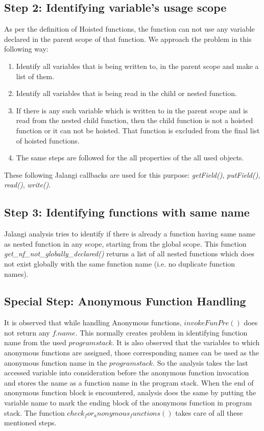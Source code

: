 \documentclass[accentcolor=tud0b,12pt,paper=a4]{tudreport}
\begin{document}
\subsection{Step 2: Identifying variable's usage scope}
As per the definition of Hoisted functions, the function can not use any variable declared in the parent scope of that function. We approach the problem in this following way:
\begin{enumerate}
	\item Identify all variables that is being written to, in the parent scope and make a list of them.
	\item Identify all variables that is being read in the child or nested function. 
	\item If there is any such variable which is written to in the parent scope and is read from the nested child function, then the child function is not a hoisted function or it can not be hoisted. That function is excluded from the final list of hoisted functions.
	\item The same steps are followed for the all properties of the all used objects.
\end{enumerate}
These following Jalangi callbacks are used for this purpose: \emph{getField()}, \emph{putField()}, \emph{read()}, \emph{write()}.

\subsection{Step 3: Identifying functions with same name}
Jalangi analysis tries to identify if there is already a function having same name as nested function in any scope, starting from the global scope. This function \emph{get\_nf\_not\_globally\_declared()} returns a list of all nested functions which does not exist globally with the same function name (i.e. no duplicate function names).

\subsection{Special Step: Anonymous Function Handling}
It is observed that while handling Anonymous functions, $invokeFunPre()$ does not return any $f.name$. This normally creates problem in identifying function name from the used $program stack$. It is also observed that the variables to which anonymous functions are assigned, those corresponding names can be used as the anonymous function name in the $program stack$. So the analysis takes the last accessed variable into consideration before the anonymous function invocation and stores the name as a function name in the program stack. When the end of anonymous function block is encountered, analysis does the same by putting the variable name to mark the ending block of the anonymous function in program stack. The function $check_for_anonymous_functions()$ takes care of all these mentioned steps.
\end{document}
